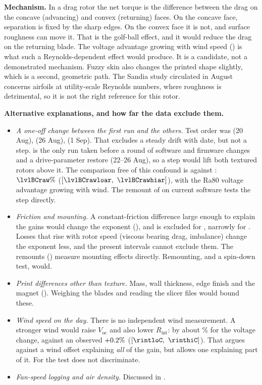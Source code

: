 \documentclass[11pt]{article}
\begin{document}
\textbf{Mechanism.} In a drag rotor the net torque is the difference between the drag on the
concave (advancing) and convex (returning) faces. On the concave face, separation is fixed by
the sharp edges. On the convex face it is not, and surface roughness can move it. That is the
golf-ball effect, and it would reduce the drag on the returning blade. The  voltage
advantage growing with wind speed () is what such a Reynolds-dependent
effect would produce. It is a candidate, not a demonstrated mechanism. Fuzzy skin also changes
the printed shape slightly, which is a second, geometric path. The Sandia study circulated in
August \cite{wilcox} concerns airfoils at utility-scale Reynolds numbers, where roughness is
detrimental, so it is not the right reference for this rotor.

\textbf{Alternative explanations, and how far the data exclude them.}
\begin{itemize}
  \item \emph{A one-off change between the first run and the others.} Test order was 
        (20 Aug),  (26 Aug),  (1 Sep). That excludes a steady drift with date,
        but not a step.  is the only run taken before a round of software and firmware
        changes and a drive-parameter restore (22–26 Aug), so a step would lift both textured
        rotors above it. The comparison free of this confound is  against :
        $\lvlBCraw\%$ ($[\lvlBCrawloar,\ \lvlBCrawhiar]$), with the Ra80 voltage advantage
        growing with wind. The remount of  on current software tests the step
        directly.
  \item \emph{Friction and mounting.} A constant-friction difference large enough to explain
        the gains would change the exponent (), and is excluded for
        , narrowly for . Losses that rise with rotor speed (viscous bearing drag,
        imbalance) change the exponent less, and the present intervals cannot exclude them.
        \ifHaveRepeat The remounts () measure mounting effects
        directly. \else Remounting, and a spin-down test, would. \fi
  \item \emph{Print differences other than texture.} Mass, wall thickness, edge finish and the
         magnet (). Weighing the blades and reading the slicer
        files would bound these.
  \item \emph{Wind speed on the day.} There is no independent wind measurement. A stronger wind
        would raise $V_\mathrm{oc}$ and also lower $R_\mathrm{int}$: by about \rifwindC\% for the 
        voltage change, against an observed $+0.2\%$ ($[\rintloC,\ \rinthiC]$). That argues
        against a wind offset explaining \emph{all} of the  gain, but allows one
        explaining part of it. For  the test does not discriminate.
  \item \emph{Fan-speed logging and air density.} Discussed in .
\end{itemize}
\end{document}
